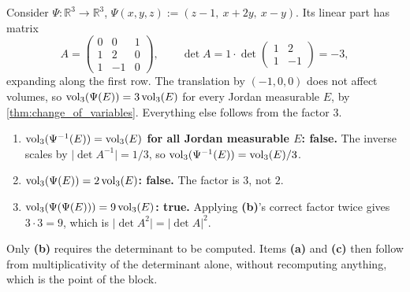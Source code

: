 \begin{example}
\label{ex:affine_volume_one_determinant}
Consider $\Psi : \mathbb{R}^3 \to \mathbb{R}^3$, $\Psi(x,y,z) := (z-1,\ x+2y,\ x-y)$. Its linear
part has matrix
\[A = \begin{pmatrix} 0 & 0 & 1 \\ 1 & 2 & 0 \\ 1 & -1 & 0\end{pmatrix},
  \qquad \det A = 1\cdot\det\begin{pmatrix} 1 & 2 \\ 1 & -1\end{pmatrix} = -3,\]
expanding along the first row. The translation by $(-1,0,0)$ does not affect volumes, so
$\operatorname{vol}_3(\Psi(E)) = 3\operatorname{vol}_3(E)$ for every Jordan measurable $E$, by
\cref{thm:change_of_variables}. Everything else follows from the factor $3$.
\begin{enumerate}[label=\textbf{(\alph*)}]
  \item \textbf{$\operatorname{vol}_3(\Psi^{-1}(E)) = \operatorname{vol}_3(E)$ for all Jordan measurable $E$: false.} The
    inverse scales by $\lvert\det A^{-1}\rvert = 1/3$, so $\operatorname{vol}_3(\Psi^{-1}(E)) = \operatorname{vol}_3(E)/3$.
  \item \textbf{$\operatorname{vol}_3(\Psi(E)) = 2\operatorname{vol}_3(E)$: false.} The factor is $3$, not $2$.
  \item \textbf{$\operatorname{vol}_3(\Psi(\Psi(E))) = 9\operatorname{vol}_3(E)$: true.} Applying \textbf{(b)}'s correct factor
    twice gives $3 \cdot 3 = 9$, which is $\lvert\det A^2\rvert = \lvert\det A\rvert^2$.
\end{enumerate}
Only \textbf{(b)} requires the determinant to be computed. Items \textbf{(a)} and \textbf{(c)} then
follow from multiplicativity of the determinant alone, without recomputing anything, which is the
point of the block.
\end{example}

